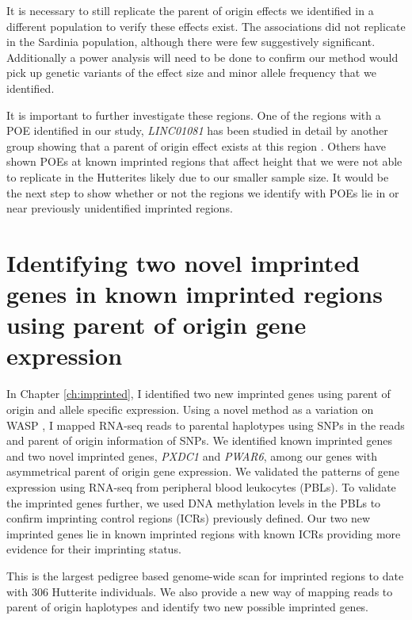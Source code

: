 It is necessary to still replicate the parent of origin effects we identified in a different population to verify these effects exist. The associations did not replicate in the Sardinia population, although there were few suggestively significant. Additionally a power analysis will need to be done to confirm our method would pick up genetic variants of the effect size and minor allele frequency that we identified.

It is important to further investigate these regions. One of the regions with a POE identified in our study, \emph{LINC01081} has been studied in detail by another group showing that a parent of origin effect exists at this region \cite{Szafranski:2016fz}. Others have shown POEs at known imprinted regions that affect height\cite{Benonisdottir:2016dz,Zoledziewska:2015do} that we were not able to replicate in the Hutterites likely due to our smaller sample size. It would be the next step to show whether or not the regions we identify with POEs lie in or near previously unidentified imprinted regions.
 
\section{Identifying two novel imprinted genes in known imprinted regions using parent of origin gene expression}

In Chapter \ref{ch:imprinted}, I identified two new imprinted genes using parent of origin and allele specific expression. Using a novel method as a variation on WASP \cite{vandeGeijn:2015hi}, I mapped RNA-seq reads to parental haplotypes using SNPs in the reads and parent of origin information of SNPs. We identified known imprinted genes and two novel imprinted genes, \emph{PXDC1} and \emph{PWAR6}, among our genes with asymmetrical parent of origin gene expression. We validated the patterns of gene expression using RNA-seq from peripheral blood leukocytes (PBLs). To validate the imprinted genes further, we used DNA methylation levels in the PBLs to confirm imprinting control regions (ICRs) previously defined\cite{Joshi:2016bb,Court:2014kc}. Our two new imprinted genes lie in known imprinted regions with known ICRs providing more evidence for their imprinting status.
 
This is the largest pedigree based genome-wide scan for imprinted regions to date with 306 Hutterite individuals. We also provide a new way of mapping reads to parent of origin haplotypes and identify two new possible imprinted genes.

